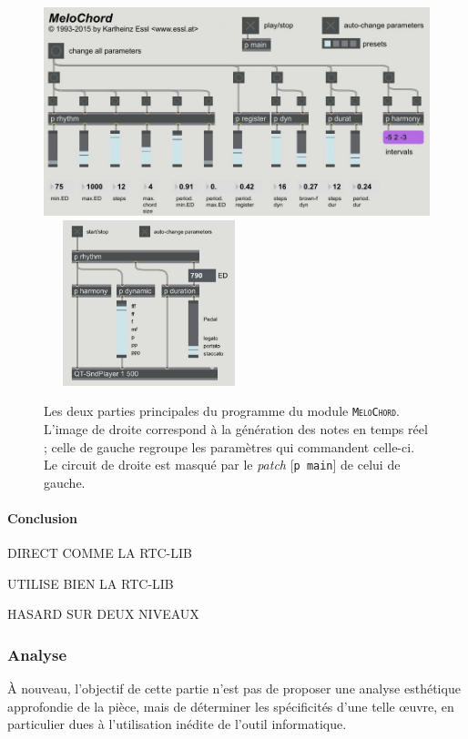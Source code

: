 \documentclass[a4paper,12pt]{article}
\newcommand{\module}[1]{\texttt{\textsc{#1}}}
\newcommand{\patch}[1]{[\texttt{#1}]}
\begin{document}
\begin{figure}[h!]
\begin{center}
\includegraphics[width=12cm]{images/melochord1.jpg}~~~\includegraphics[width=5cm]{images/melochord2.jpg}
\label{melochordmain}
\caption{\footnotesize Les deux parties principales du programme du module \module{MeloChord}. L'image de droite correspond à la génération des notes en temps réel ; celle de gauche regroupe les paramètres qui commandent celle-ci. Le circuit de droite est masqué par le \emph{patch} \patch{p main} de celui de gauche.}
\end{center}
\end{figure}


\paragraph{Conclusion \\}

DIRECT COMME LA RTC-LIB

UTILISE BIEN LA RTC-LIB

HASARD SUR DEUX NIVEAUX


\subsubsection{Analyse}

À nouveau, l'objectif de cette partie n'est pas de proposer une analyse esthétique approfondie de la pièce, mais de déterminer les spécificités d'une telle œuvre, en particulier dues à l'utilisation inédite de l'outil informatique.
\end{document}
